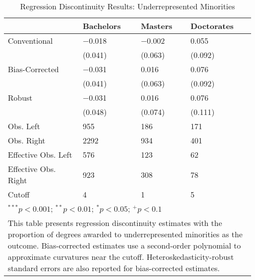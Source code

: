 \begin{table}
\caption{Regression Discontinuity Results: Underrepresented Minorities}
\centering
\begin{tabularx}{\textwidth}{l>{\centering\arraybackslash}X>{\centering\arraybackslash}X>{\centering\arraybackslash}X}
\toprule
  & Bachelors & Masters & Doctorates\\
\midrule
Conventional & \num{-0.018} & \num{-0.002} & \num{0.055}\\
 & (\num{0.041}) & (\num{0.063}) & (\num{0.092})\\
Bias-Corrected & \num{-0.031} & \num{0.016} & \num{0.076}\\
 & (\num{0.041}) & (\num{0.063}) & (\num{0.092})\\
Robust & \num{-0.031} & \num{0.016} & \num{0.076}\\
 & (\num{0.048}) & (\num{0.074}) & (\num{0.111})\\
\midrule
Obs. Left & \num{955} & \num{186} & \num{171}\\
Obs. Right & \num{2292} & \num{934} & \num{401}\\
Effective Obs. Left & \num{576} & \num{123} & \num{62}\\
Effective Obs. Right & \num{923} & \num{308} & \num{78}\\
Cutoff & \num{4} & \num{1} & \num{5}\\
\bottomrule
\multicolumn{4}{l}{\scriptsize \rule{0pt}{1em}$^{***}p<0.001$; $^{**}p<0.01$; $^{*}p<0.05$; $^{+}p<0.1$}\\
\multicolumn{4}{p{\textwidth}}{\rule{0pt}{1em}This table presents regression discontinuity estimates with the proportion of degrees awarded to underrepresented minorities as the outcome. Bias-corrected estimates use a second-order polynomial to approximate curvatures near the cutoff. Heteroskedasticity-robust standard errors are also reported for bias-corrected estimates.}\\
\end{tabularx}
\end{table}


